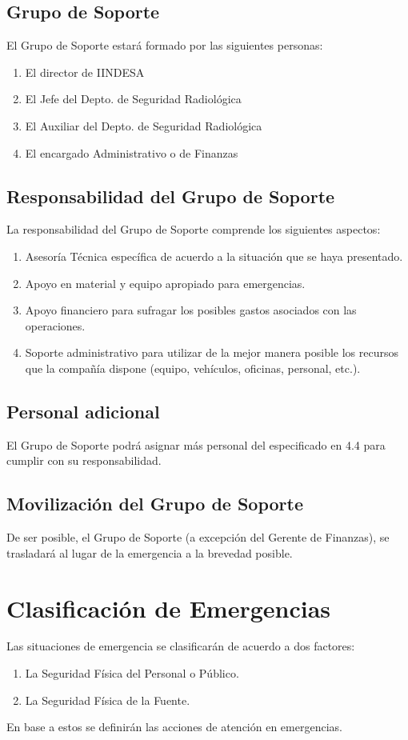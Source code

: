 \subsection*{Grupo de Soporte}
El Grupo de Soporte estará formado por las siguientes personas:
\begin{enumerate}
    \item El director de IINDESA
    \item El Jefe del Depto. de Seguridad Radiológica
    \item El Auxiliar del Depto. de Seguridad Radiológica
    \item El encargado Administrativo o de Finanzas
\end{enumerate}

\subsection*{Responsabilidad del Grupo de Soporte}
La responsabilidad del Grupo de Soporte comprende los siguientes aspectos:
\begin{enumerate}
    \item Asesoría Técnica específica de acuerdo a la situación que se haya presentado.
    \item Apoyo en material y equipo apropiado para emergencias.
    \item Apoyo financiero para sufragar los posibles gastos asociados con las operaciones.
    \item Soporte administrativo para utilizar de la mejor manera posible los recursos que la compañía dispone (equipo, vehículos, oficinas, personal, etc.).
\end{enumerate}

\subsection*{Personal adicional}
El Grupo de Soporte podrá asignar más personal del especificado en 4.4 para cumplir con su responsabilidad.

\subsection*{Movilización del Grupo de Soporte}
De ser posible, el Grupo de Soporte (a excepción del Gerente de Finanzas), se trasladará al lugar de la emergencia a la brevedad posible.

\section*{Clasificación de Emergencias}
Las situaciones de emergencia se clasificarán de acuerdo a dos factores:
\begin{enumerate}
    \item La Seguridad Física del Personal o Público.
    \item La Seguridad Física de la Fuente.
\end{enumerate}

En base a estos se definirán las acciones de atención en emergencias.
